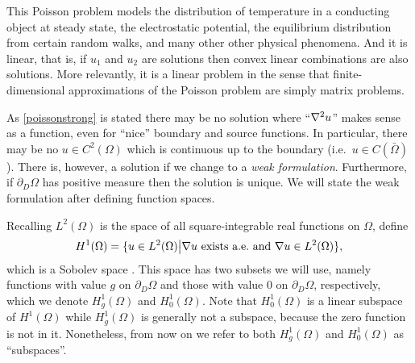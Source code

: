 This Poisson problem models the distribution of temperature in a conducting object at steady state, the electrostatic potential, the equilibrium distribution from certain random walks, and many other other physical phenomena.  And it is linear, that is, if $u_1$ and $u_2$ are solutions then convex linear combinations are also solutions.  More relevantly, it is a linear problem in the sense that finite-dimensional approximations of the Poisson problem are simply matrix problems.

As \eqref{poissonstrong} is stated there may be no solution where ``$\nabla^2 u$'' makes sense as a function, even for ``nice'' boundary and source functions.  In particular, there may be no $u\in C^2(\Omega)$ which is continuous up to the boundary (i.e.~$u\in C(\bar\Omega)$).  There is, however, a solution if we change to a \emph{weak formulation}.  Furthermore, if $\partial_D \Omega$ has positive measure then the solution is unique.  We will state the weak formulation after defining function spaces.

Recalling $L^2(\Omega)$ is the space of all square-integrable real functions on $\Omega$, define
    $$H^1(\Omega) = \{u\in L^2(\Omega) \big| \nabla u \text{ exists a.e.~and } \nabla u \in L^2(\Omega)\},$$
which is a Sobolev space \citep{Evans}.  This space has two subsets we will use, namely functions with value $g$ on $\partial_D \Omega$ and those with value $0$ on $\partial_D \Omega$, respectively, which we denote $H_g^1(\Omega)$ and $H_0^1(\Omega)$.  Note that $H_0^1(\Omega)$ is a linear subspace of $H^1(\Omega)$ while $H_g^1(\Omega)$ is generally not a subspace, because the zero function is not in it.  Nonetheless, from now on we refer to both $H_g^1(\Omega)$ and $H_0^1(\Omega)$ as ``subspaces''.

